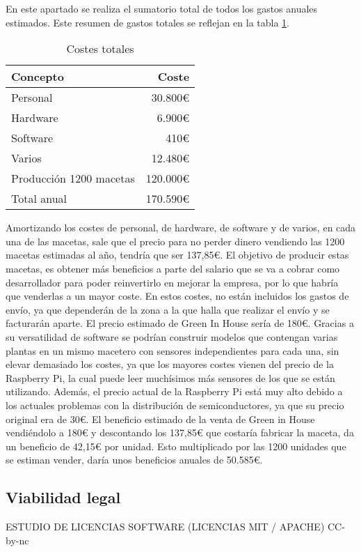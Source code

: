             En este apartado se realiza el sumatorio total de todos los gastos anuales estimados. Este resumen de gastos totales se reflejan en la tabla \ref{tab:costes totales por maceta de plan de negocio}.
            \begin{table}[H]
                \centering
                \caption{Costes totales}
                \begin{tabular}{|l|r|}
                    \hline
                    Concepto & Coste \\
                    \hline
                    Personal & 30.800€ \\
                    Hardware & 6.900€ \\
                    Software & 410€ \\
                    Varios & 12.480€ \\
                    Producción 1200 macetas & 120.000€ \\
                    \hline
                    Total anual & 170.590€ \\
                    \hline
                \end{tabular}
                \label{tab:costes totales por maceta de plan de negocio}
            \end{table}
            Amortizando los costes de personal, de hardware, de software y de varios, en cada una de las macetas, sale que el precio para no perder dinero vendiendo las 1200 macetas estimadas al año, tendría que ser 137,85€. El objetivo de producir estas macetas, es obtener más beneficios a parte del salario que se va a cobrar como desarrollador para poder reinvertirlo en mejorar la empresa, por lo que habría que venderlas a un mayor coste. En estos costes, no están incluidos los gastos de envío, ya que dependerán de la zona a la que halla que realizar el envío y se facturarán aparte. El precio estimado de Green In House sería de 180€. 
            Gracias a su versatilidad de software se podrían construir modelos que contengan varias plantas en un mismo macetero con sensores independientes para cada una, sin elevar demasiado los costes, ya que los mayores costes vienen del precio de la Raspberry Pi, la cual puede leer muchísimos más sensores de los que se están utilizando. Además, el precio actual de la Raspberry Pi está muy alto debido a los actuales problemas con la distribución de semiconductores, ya que su precio original era de 30€.
            El beneficio estimado de la venta de Green in House vendiéndolo a 180€ y descontando los 137,85€ que costaría fabricar la maceta, da un beneficio de 42,15€ por unidad. Esto multiplicado por las 1200 unidades que se estiman vender, daría unos beneficios anuales de 50.585€.

    
    \subsection{Viabilidad legal}
    ESTUDIO DE LICENCIAS SOFTWARE
    (LICENCIAS MIT / APACHE)
    CC-by-nc
    
    